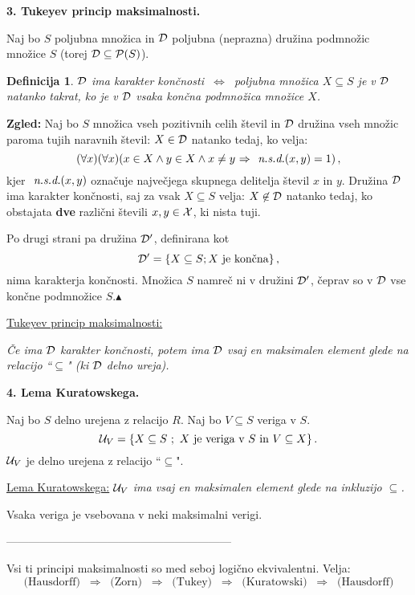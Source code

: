 \documentclass[11pt,paper=b5,footinclude,headinclude]{scrbook} %
\def\sledi {{~\Rightarrow~}}
\def\cee {{~\Leftrightarrow~}}
\def\zgled{\noindent\textbf{\color{blue} Zgled: }}
\def\kz{{\hfill{\color{blue}$\blacktriangle$}}}%
\newtheorem*{definicija}{Definicija}
\begin{document}
\bigskip
\bigskip
\textbf{3. Tukeyev princip maksimalnosti.}

Naj bo $S$ poljubna množica in ${\cal D}$ poljubna (neprazna) družina podmnožic množice $S$ (torej ${\cal D}\subseteq {\cal P}(S)$).

\begin{definicija}
${\cal D}$  ima {\em karakter končnosti} $\cee$ poljubna množica $X\subseteq S$ je v ${\cal D}$ natanko takrat, ko je v ${\cal D}$ vsaka {\em končna} podmnožica množice $X$.
\end{definicija}

\medskip
\zgled
Naj bo $S$ množica vseh pozitivnih celih števil in ${\cal D}$ družina vseh množic paroma tujih naravnih števil:
$X\in {\cal D}$ natanko tedaj, ko velja:
$$(\forall x)(\forall x)(x\in X \land y\in X\land x\neq y\sledi \emph{ n.s.d.}(x,y) = 1)\,,$$
kjer $\emph{ n.s.d.}(x,y)$ označuje največjega skupnega delitelja števil $x$ in $y$.
Družina ${\cal D}$ ima karakter končnosti, saj za vsak $X\subseteq S$ velja:
$X\not\in {\cal D}$ natanko tedaj, ko obstajata \textbf{dve} različni števili $x,y\in {\cal X}$,  ki nista tuji.

Po drugi strani pa družina ${\cal D}'$, definirana kot
$${\cal D}' = \{X\subseteq S; X \textrm{ je končna}\}\,,$$
nima karakterja končnosti. Množica $S$ namreč ni v družini ${\cal D}'$,
čeprav so v ${\cal D}$ vse končne podmnožice $S$.\kz

\bigskip
\underline{Tukeyev princip maksimalnosti:}

{\em Če ima ${\cal D}$ karakter končnosti, potem ima ${\cal D}$ vsaj en maksimalen element glede na relacijo ``$\subseteq$" (ki ${\cal D}$ delno ureja).}

\bigskip

\textbf{4. Lema Kuratowskega.}

Naj bo $S$ delno urejena z relacijo $R$. Naj bo $V\subseteq S$ veriga v $S$.
$${\cal U}_V = \{X\subseteq S~;~X\textrm{ je veriga v }S \textrm{ in } V\subseteq X\}\,.$$
${\cal U}_V$ je delno urejena z relacijo ``$\subseteq$".

\underline{Lema Kuratowskega:}
{\em ${\cal U}_V$ ima vsaj en maksimalen element glede na inkluzijo $\subseteq$.}

\medskip
Vsaka veriga je vsebovana v neki maksimalni verigi.

------------------------------------------------------------

\bigskip

Vsi ti principi maksimalnosti so med seboj logično ekvivalentni.
Velja:
$$\textrm{(Hausdorff) $\sledi$ (Zorn) $\sledi$ (Tukey) $\sledi$ (Kuratowski) $\sledi$ (Hausdorff)}$$
\end{document}
